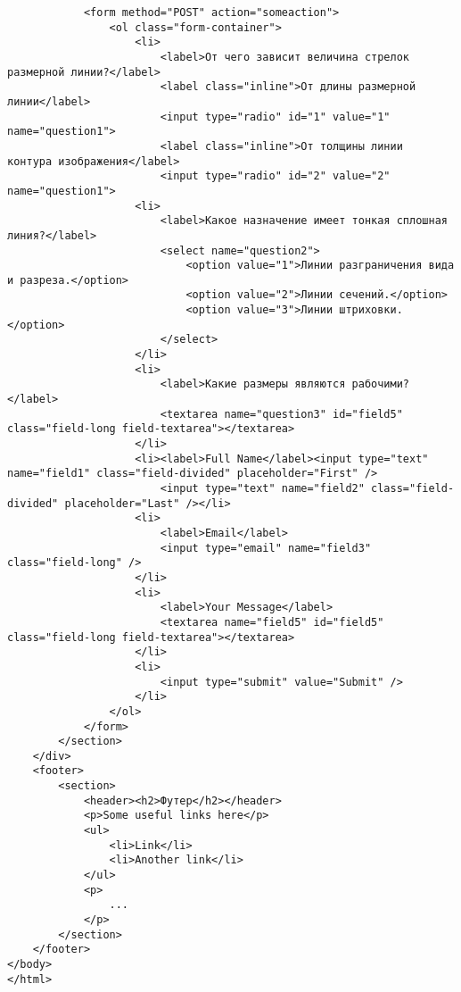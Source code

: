 \begin{lstlisting}
            <form method="POST" action="someaction">
                <ol class="form-container">
                    <li>
                        <label>От чего зависит величина стрелок размерной линии?</label>
                        <label class="inline">От длины размерной линии</label>
                        <input type="radio" id="1" value="1" name="question1">
                        <label class="inline">От толщины линии  контура изображения</label>
                        <input type="radio" id="2" value="2" name="question1">
                    <li>
                        <label>Какое назначение имеет тонкая сплошная линия?</label>
                        <select name="question2">
                            <option value="1">Линии разграничения вида и разреза.</option>
                            <option value="2">Линии сечений.</option>
                            <option value="3">Линии штриховки.</option>
                        </select>
                    </li>
                    <li>
                        <label>Какие размеры являются рабочими? </label>
                        <textarea name="question3" id="field5" class="field-long field-textarea"></textarea>
                    </li>
                    <li><label>Full Name</label><input type="text" name="field1" class="field-divided" placeholder="First" />
                        <input type="text" name="field2" class="field-divided" placeholder="Last" /></li>
                    <li>
                        <label>Email</label>
                        <input type="email" name="field3" class="field-long" />
                    </li>
                    <li>
                        <label>Your Message</label>
                        <textarea name="field5" id="field5" class="field-long field-textarea"></textarea>
                    </li>
                    <li>
                        <input type="submit" value="Submit" />
                    </li>
                </ol>
            </form>
        </section>
    </div>
    <footer>
        <section>
            <header><h2>Футер</h2></header>
            <p>Some useful links here</p>
            <ul>
                <li>Link</li>
                <li>Another link</li>
            </ul>
            <p>
                ...
            </p>
        </section>
    </footer>
</body>
</html>
\end{lstlisting}

